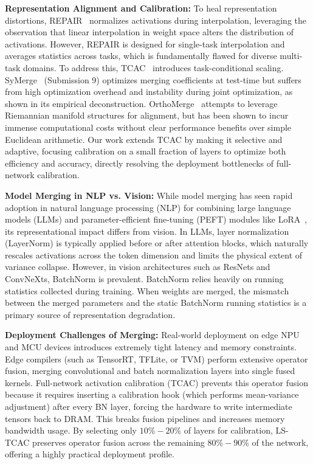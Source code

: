 \documentclass{article}
\theoremstyle{plain}
\theoremstyle{definition}
\theoremstyle{remark}
\begin{document}
\textbf{Representation Alignment and Calibration:} To heal representation distortions, REPAIR~\cite{jordan2022repair} normalizes activations during interpolation, leveraging the observation that linear interpolation in weight space alters the distribution of activations. However, REPAIR is designed for single-task interpolation and averages statistics across tasks, which is fundamentally flawed for diverse multi-task domains. To address this, TCAC~\cite{tcac2026pragmatic} introduces task-conditional scaling. SyMerge~\cite{symerge2026deconstructing} (Submission 9) optimizes merging coefficients at test-time but suffers from high optimization overhead and instability during joint optimization, as shown in its empirical deconstruction. OrthoMerge~\cite{orthomerge2026demystifying} attempts to leverage Riemannian manifold structures for alignment, but has been shown to incur immense computational costs without clear performance benefits over simple Euclidean arithmetic. Our work extends TCAC by making it selective and adaptive, focusing calibration on a small fraction of layers to optimize both efficiency and accuracy, directly resolving the deployment bottlenecks of full-network calibration.

\textbf{Model Merging in NLP vs. Vision:} While model merging has seen rapid adoption in natural language processing (NLP) for combining large language models (LLMs) and parameter-efficient fine-tuning (PEFT) modules like LoRA~\cite{hu2021lora}, its representational impact differs from vision. In LLMs, layer normalization (LayerNorm) is typically applied before or after attention blocks, which naturally rescales activations across the token dimension and limits the physical extent of variance collapse. However, in vision architectures such as ResNets and ConvNeXts, BatchNorm is prevalent. BatchNorm relies heavily on running statistics collected during training. When weights are merged, the mismatch between the merged parameters and the static BatchNorm running statistics is a primary source of representation degradation.

\textbf{Deployment Challenges of Merging:} Real-world deployment on edge NPU and MCU devices introduces extremely tight latency and memory constraints. Edge compilers (such as TensorRT, TFLite, or TVM) perform extensive operator fusion, merging convolutional and batch normalization layers into single fused kernels. Full-network activation calibration (TCAC) prevents this operator fusion because it requires inserting a calibration hook (which performs mean-variance adjustment) after every BN layer, forcing the hardware to write intermediate tensors back to DRAM. This breaks fusion pipelines and increases memory bandwidth usage. By selecting only $10\%-20\%$ of layers for calibration, LS-TCAC preserves operator fusion across the remaining $80\%-90\%$ of the network, offering a highly practical deployment profile.
\end{document}
